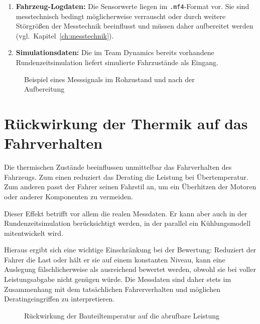 \begin{enumerate}
    \item \textbf{Fahrzeug-Logdaten:} Die Sensorwerte liegen im
          \texttt{.mf4}-Format vor. Sie sind messtechnisch bedingt
          möglicherweise verrauscht oder durch weitere Störgrößen der
          Messtechnik beeinflusst und müssen daher aufbereitet werden
          (vgl.~Kapitel~\ref{ch:messtechnik}).
    \item \textbf{Simulationsdaten:} Die im Team Dynamics bereits vorhandene
          Rundenzeitsimulation liefert simulierte Fahrzustände als Eingang.
\end{enumerate}

\begin{figure}[htbp]
    \centering
    \caption{Beispiel eines Messsignals im Rohzustand und nach der Aufbereitung}
    \label{fig:rohdaten_gefiltert}
\end{figure}

\section{Rückwirkung der Thermik auf das Fahrverhalten}
\label{sec:rueckwirkung}

Die thermischen Zustände beeinflussen unmittelbar das Fahrverhalten des
Fahrzeugs. Zum einen reduziert das Derating die Leistung bei Übertemperatur.
Zum anderen passt der Fahrer seinen Fahrstil an, um ein Überhitzen der Motoren
oder anderer Komponenten zu vermeiden.

Dieser Effekt betrifft vor allem die realen Messdaten. Er kann aber auch in
der Rundenzeitsimulation berücksichtigt werden, in der parallel ein
Kühlungsmodell mitentwickelt wird.

Hieraus ergibt sich eine wichtige Einschränkung bei der Bewertung: Reduziert
der Fahrer die Last oder hält er sie auf einem konstanten Niveau, kann eine
Auslegung fälschlicherweise als ausreichend bewertet werden, obwohl sie bei
voller Leistungsabgabe nicht genügen würde. Die Messdaten sind daher stets im
Zusammenhang mit dem tatsächlichen Fahrerverhalten und möglichen
Deratingeingriffen zu interpretieren.

\begin{figure}[htbp]
    \centering
    \caption{Rückwirkung der Bauteiltemperatur auf die abrufbare Leistung}
    \label{fig:rueckwirkung}
\end{figure}

